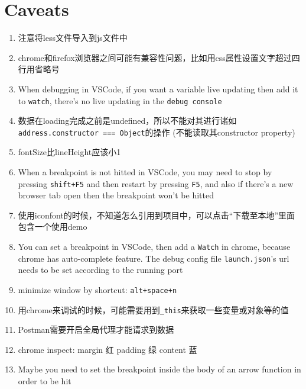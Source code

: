 \documentclass[a4paper, 12pt]{article}
\begin{document}
\section{Caveats}
\begin{enumerate}

\item 注意将less文件导入到js文件中

\item chrome和firefox浏览器之间可能有兼容性问题，比如用css属性设置文字超过四行用省略号

\item When debugging in VSCode, if you want a variable live updating then add it to \verb|watch|, there's no live updating in the \verb|debug console|

\item 数据在loading完成之前是undefined，所以不能对其进行诸如\\ \verb|address.constructor === Object|的操作 (不能读取其constructor property)

\item fontSize比lineHeight应该小1

\item When a breakpoint is not hitted in VSCode, you may need to stop by pressing \verb|shift+F5| and then restart by pressing \verb|F5|, and also if there's a new browser tab open then the breakpoint won't be hitted

\item 使用iconfont的时候，不知道怎么引用到项目中，可以点击“下载至本地”里面包含一个使用demo

\item You can set a breakpoint in VSCode, then add a \verb|Watch| in chrome, because chrome has auto-complete feature. The debug config file \verb|launch.json|'s url needs to be set according to the running port

\item minimize window by shortcut: \verb|alt+space+n|

\item 用chrome来调试的时候，可能需要用到\verb|_this|来获取一些变量或对象等的值

\item Postman需要开启全局代理才能请求到数据

\item chrome inspect: margin 红 \quad padding 绿 \quad content 蓝

\item Maybe you need to set the breakpoint inside the body of an arrow function in order to be hit


\end{enumerate}
\end{document}
